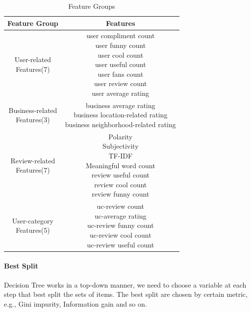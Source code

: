 \documentclass{vgtc}                          %
\begin{document}
\begin{table}
\centering
\caption{Feature Groups}
\label{table:para_regression}
\begin{tabular}{|c|c|}
\hline
Feature Group & Features \\ \hline
\tabincell{c}{User-related \\Features(7)} & \tabincell{c}{user compliment count\\user funny count\\user cool count\\user useful count\\user fans count \\ user review count \\ user average rating} \\ \hline
\tabincell{c}{Business-related \\Features(3)} & \tabincell{c}{business average rating\\business location-related rating\\business neighborhood-related rating} \\ \hline
\tabincell{c}{Review-related \\Features(7)} & \tabincell{c}{Polarity \\  Subjectivity  \\  TF-IDF  \\ Meaningful word count  \\ review useful count\\ review cool count \\ review funny count  } \\  \hline
\tabincell{c}{User-category \\Features(5)} & \tabincell{c}{  uc-review count   \\  uc-average rating  \\ uc-review funny count \\  uc-review  cool count   \\  uc-review useful count }\\
\hline
\end{tabular}
\end{table}


\paragraph{Best Split}
Decision Tree works in a top-down manner, we need to choose a variable at each step that best split the sets of items. The best split are chosen by certain metric, e.g., Gini impurity, Information gain and so on. 
\end{document}
